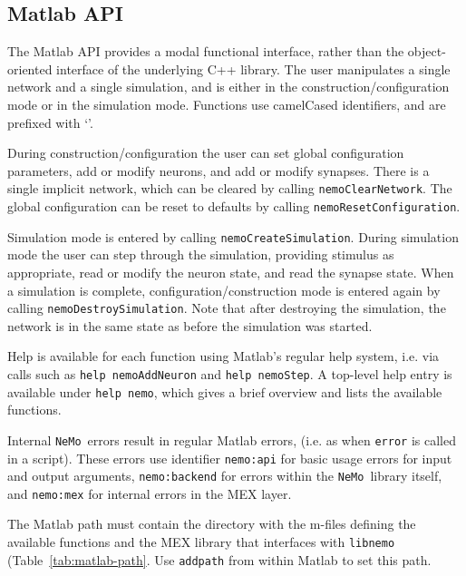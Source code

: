 \documentclass[a4paper]{article}
\newcommand{\nemo}{\texttt{NeMo}\xspace}
\newcommand{\code}[1]{\texttt{#1}}
\begin{document}
\subsection{Matlab API}
\label{sec:matlab}


The Matlab API provides a modal functional interface, rather than the
object-oriented interface of the underlying C++ library. The user manipulates a
single network and a single simulation, and is either in the
construction/configuration mode or in the simulation mode. Functions use
camelCased identifiers, and are prefixed with `\verb@nemo@'.


During construction/configuration the user can set global configuration
parameters, add or modify neurons, and add or modify synapses. There is a
single implicit network, which can be cleared by calling
\code{nemoClearNetwork}. The global configuration can be reset to defaults by
calling \code{nemoResetConfiguration}.


Simulation mode is entered by calling \code{nemoCreateSimulation}. During
simulation mode the user can step through the simulation, providing stimulus as
appropriate, read or modify the neuron state, and read the synapse state. When
a simulation is complete, configuration/construction mode is entered again by
calling \code{nemoDestroySimulation}. Note that after destroying the
simulation, the network is in the same state as before the simulation was
started.

Help is available for each function using Matlab's regular help system, i.e.
via calls such as \code{help nemoAddNeuron} and \code{help nemoStep}. A
top-level help entry is available under \code{help nemo}, which gives a brief
overview and lists the available functions.

Internal \nemo\ errors result in regular Matlab errors, (i.e. as when
\code{error} is called in a script).  These errors use identifier
\code{nemo:api} for basic usage errors for input and output arguments,
\code{nemo:backend} for errors within the \nemo\ library itself, and
\code{nemo:mex} for internal errors in the MEX layer.

The Matlab path must contain the directory with the m-files defining the
available functions and the MEX library that interfaces with \code{libnemo}
(Table~\ref{tab:matlab-path}.  Use \code{addpath} from within Matlab to set
this path.
\end{document}
